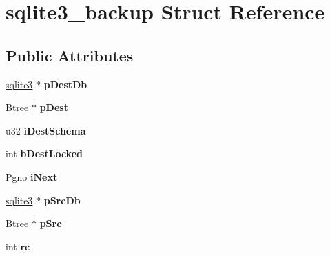 \hypertarget{structsqlite3__backup}{}\section{sqlite3\+\_\+backup Struct Reference}
\label{structsqlite3__backup}
\subsection*{Public Attributes}
\begin{DoxyCompactItemize}
\item 
\mbox{\label{structsqlite3__backup_ad9b5074a860e01b31bbf9cb27f3808d9}} 
\mbox{\hyperlink{structsqlite3}{sqlite3}} $\ast$ {\bfseries p\+Dest\+Db}
\item 
\mbox{\label{structsqlite3__backup_a9e011336a89274f0ebfefdcede198f71}} 
\mbox{\hyperlink{struct_btree}{Btree}} $\ast$ {\bfseries p\+Dest}
\item 
\mbox{\label{structsqlite3__backup_a3f294f50b4ef206452dddd14f2a7cf6a}} 
u32 {\bfseries i\+Dest\+Schema}
\item 
\mbox{\label{structsqlite3__backup_aa0d385678bc5c3fd4da4201ff03a5856}} 
int {\bfseries b\+Dest\+Locked}
\item 
\mbox{\label{structsqlite3__backup_a92454bf354f928aade2b2f92e6cfd088}} 
Pgno {\bfseries i\+Next}
\item 
\mbox{\label{structsqlite3__backup_a0bcc0528bb3f5ec52eb40c3e7a4f7adc}} 
\mbox{\hyperlink{structsqlite3}{sqlite3}} $\ast$ {\bfseries p\+Src\+Db}
\item 
\mbox{\label{structsqlite3__backup_aa48f873d1de446638ff71fdae606e672}} 
\mbox{\hyperlink{struct_btree}{Btree}} $\ast$ {\bfseries p\+Src}
\item 
\mbox{\label{structsqlite3__backup_aab860dbed6181702b4c6b80d43cde411}} 
int {\bfseries rc}
\item 
\mbox{\label{structsqlite3__backup_a4287faa23d4534e8a33915740604d1e1}} 

\end{DoxyCompactItemize}
